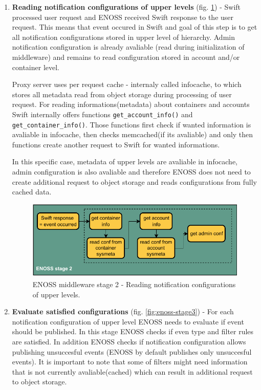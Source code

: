 \begin{enumerate}
        \item \textbf{Reading notification configurations of upper levels} (fig. \ref{fig:enoss-stage2}) - Swift processed user request and ENOSS received Swift response to the user request. This means that event occured in Swift and goal of this step is to get all notification configurations stored in upper level of hierarchy. Admin notification configuration is already avaliable (read during initialization of middleware) and remains to read configuration stored in account and/or container level.

        Proxy server uses per request cache - internaly called infocache, to which stores all metadata read from object storage during processing of user request. For reading informations(metadata) about containers and accounts Swift internally offers functions \texttt{get\_account\_info()} and \texttt{get\_container\_info()}. Those functions first check if wanted information is avaliable in infocache, then checks memcached(if its avaliable) and only then functions create another request to Swift for wanted informations.

        In this specific case, metadata of upper levels are avaliable in infocache, admin configuration is also avaliable and therefore ENOSS does not need to create additional request to object storage and reads configurations from fully cached data.

        \begin{figure}[H]
            \centering
            \includegraphics[width=1\textwidth]{obrazky-figures/enoss-stage2.pdf}
            \caption{ENOSS middleware stage 2 - Reading notification configurations of upper levels.}
            \label{fig:enoss-stage2}
        \end{figure}

        \item \textbf{Evaluate satisfied configurations} (fig. \ref{fig:enoss-stage3}) - For each notification configuration of upper level ENOSS needs to evaluate if event should be published. In this stage ENOSS checks if even type and filter rules are satisfied. In addition ENOSS checks if notification configuration allows publishing unsuccesful events (ENOSS by default publishes only unsuccesful events). It is important to note that some of filters might need information that is not currently avaliable(cached) which can result in additional request to object storage.


\end{enumerate}

